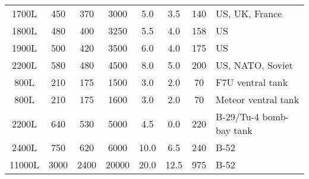 \begin{twocolumntablefloat}
\begin{twocolumntable}
{\begin{tabular}{cccccccl}
\phantom{0}1700L&\phantom{0}450&\phantom{0}370&\phantom{0}3000&\phantom{0}5.0&\phantom{0}3.5&\phantom{}140&US, UK, France\\
\phantom{0}1800L&\phantom{0}480&\phantom{0}400&\phantom{0}3250&\phantom{0}5.5&\phantom{0}4.0&\phantom{}158&US\\
\phantom{0}1900L&\phantom{0}500&\phantom{0}420&\phantom{0}3500&\phantom{0}6.0&\phantom{0}4.0&\phantom{}175&US\\
\phantom{0}2200L&\phantom{0}580&\phantom{0}480&\phantom{0}4500&\phantom{0}8.0&\phantom{0}5.0&\phantom{}200&US, NATO, Soviet\\
\midrule
\phantom{00}800L&\phantom{0}210&\phantom{0}175&\phantom{0}1500&\phantom{0}3.0&\phantom{0}2.0&\phantom{0}70&F7U ventral tank\\
\phantom{00}800L&\phantom{0}210&\phantom{0}175&\phantom{0}1600&\phantom{0}3.0&\phantom{0}2.0&\phantom{0}70&Meteor ventral tank\\
\phantom{0}2200L&\phantom{0}640&\phantom{0}530&\phantom{0}5000&\phantom{0}4.5&\phantom{0}0.0&\phantom{0}220&B-29/Tu-4 bomb-bay tank\\
\phantom{0}2400L&\phantom{0}750&\phantom{0}620&\phantom{0}6000&\phantom{}10.0&\phantom{0}6.5&\phantom{0}240&B-52\\
\phantom{}11000L&\phantom{}3000&\phantom{}2400&\phantom{}20000&\phantom{}20.0&12.5&\phantom{0}975&B-52\\
\bottomrule
\end{tabular}

}
\end{twocolumntable}
\end{twocolumntablefloat}